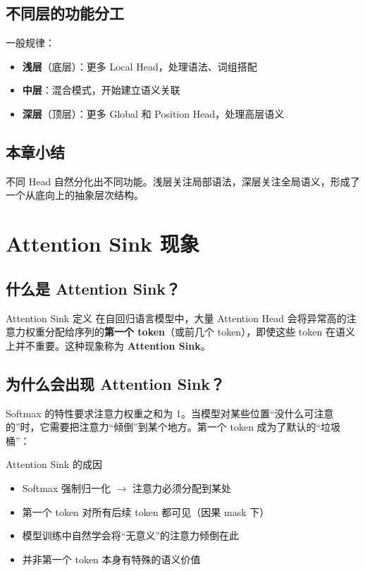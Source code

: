 \documentclass[a4paper]{article}
\begin{document}
\subsection{不同层的功能分工}

一般规律：
\begin{itemize}
  \item \textbf{浅层}（底层）：更多 Local Head，处理语法、词组搭配
  \item \textbf{中层}：混合模式，开始建立语义关联
  \item \textbf{深层}（顶层）：更多 Global 和 Position Head，处理高层语义
\end{itemize}

\subsection{本章小结}

不同 Head 自然分化出不同功能。浅层关注局部语法，深层关注全局语义，形成了一个从底向上的抽象层次结构。

\section{Attention Sink 现象}

\subsection{什么是 Attention Sink？}

\begin{importantbox}{Attention Sink 定义}
在自回归语言模型中，大量 Attention Head 会将异常高的注意力权重分配给序列的\textbf{第一个 token}（或前几个 token），即使这些 token 在语义上并不重要。这种现象称为 \textbf{Attention Sink}。
\end{importantbox}

\subsection{为什么会出现 Attention Sink？}

Softmax 的特性要求注意力权重之和为 1。当模型对某些位置``没什么可注意的''时，它需要把注意力``倾倒''到某个地方。第一个 token 成为了默认的``垃圾桶''：

\begin{warningbox}{Attention Sink 的成因}
\begin{itemize}
  \item Softmax 强制归一化 $\to$ 注意力必须分配到某处
  \item 第一个 token 对所有后续 token 都可见（因果 mask 下）
  \item 模型训练中自然学会将``无意义''的注意力倾倒在此
  \item 并非第一个 token 本身有特殊的语义价值
\end{itemize}
\end{warningbox}
\end{document}
